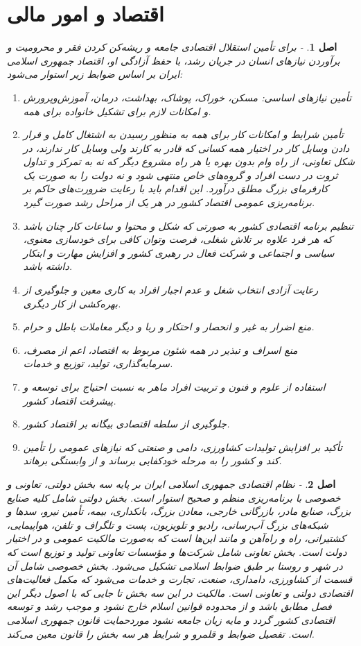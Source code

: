 \documentclass[12pt]{article}
\newtheorem{asl}{اصل}
\begin{document}
\section{اقتصاد و امور مالی}
\begin{asl}- 
برای تأمین استقلال اقتصادی جامعه و ریشه‌کن کردن فقر و محرومیت و برآوردن نیازهای انسان در جریان رشد، با حفظ آزادگی او، اقتصاد جمهوری اسلامی ایران بر اساس ضوابط زیر استوار می‌شود:
\begin{enumerate}
	\item 
	تأمین نیازهای اساسی‌: مسکن‌، خوراک‌، پوشاک‌، بهداشت‌، درمان‌، آموزش‌وپرورش و امکانات لازم برای تشکیل خانواده برای همه‌.
	\item
	تأمین شرایط و امکانات کار برای همه به منظور رسیدن به اشتغال کامل و قرار دادن وسایل کار در اختیار همه کسانی که قادر به کارند ولی وسایل کار ندارند، در شکل تعاونی‌، از راه وام بدون بهره یا هر راه مشروع دیگر که نه به تمرکز و تداول ثروت در دست افراد و گروه‌های خاص منتهی شود و نه دولت را به صورت یک کارفرمای بزرگ مطلق درآورد. این اقدام باید با رعایت ضرورت‌های حاکم بر برنامه‌ریزی عمومی اقتصاد کشور در هر یک از مراحل رشد صورت گیرد.
	\item
	تنظیم برنامه اقتصادی کشور به صورتی که شکل و محتوا و ساعات کار چنان باشد که هر فرد علاوه بر تلاش شغلی‌، فرصت وتوان کافی برای خودسازی معنوی‌، سیاسی و اجتماعی و شرکت فعال در رهبری کشور و افزایش مهارت و ابتکار داشته باشد.	
	\item
	رعایت آزادی انتخاب شغل و عدم اجبار افراد به کاری معین و جلوگیری از بهره‌کشی از کار دیگری‌.	
	\item
	منع اضرار به غیر و انحصار و احتکار و ربا و دیگر معاملات باطل و حرام‌.
	\item
	منع اسراف و تبذیر در همه شئون مربوط به اقتصاد، اعم از مصرف، سرمایه‌گذاری‌، تولید، توزیع و خدمات‌.
	\item
	استفاده از علوم و فنون و تربیت افراد ماهر به نسبت احتیاج برای توسعه و پیشرفت اقتصاد کشور.
	\item
	جلوگیری از سلطه اقتصادی بیگانه بر اقتصاد کشور.
	\item
	تأکید بر افزایش تولیدات کشاورزی‌، دامی و صنعتی که نیازهای عمومی را تأمین کند و کشور را به مرحله خودکفایی برساند و از وابستگی برهاند.
\end{enumerate}
\end{asl}

\begin{asl}- 
نظام اقتصادی جمهوری اسلامی ایران بر پایه سه بخش دولتی‌، تعاونی و خصوصی با برنامه‌ریزی منظم و صحیح استوار است‌.
بخش دولتی شامل کلیه صنایع بزرگ‌، صنایع مادر، بازرگانی خارجی، معادن بزرگ‌، بانکداری‌، بیمه‌، تأمین نیرو، سدها و شبکه‌های بزرگ آب‌رسانی، رادیو و تلویزیون‌، پست و تلگراف و تلفن، هواپیمایی‌، کشتیرانی‌، راه و راه‌آهن و مانند این‌ها است که به‌صورت مالکیت عمومی و در اختیار دولت است‌.
بخش تعاونی شامل شرکت‌ها و مؤسسات تعاونی تولید و توزیع است که در شهر و روستا بر طبق ضوابط اسلامی تشکیل می‌شود.
بخش خصوصی شامل آن قسمت از کشاورزی‌، دامداری‌، صنعت‌، تجارت و خدمات می‌شود که مکمل فعالیت‌های اقتصادی دولتی و تعاونی است‌.
مالکیت در این سه بخش تا جایی که با اصول دیگر این فصل مطابق باشد و از محدوده قوانین اسلام خارج نشود و موجب رشد و توسعه اقتصادی کشور گردد و مایه زیان جامعه نشود موردحمایت قانون جمهوری اسلامی است‌.
تفصیل ضوابط و قلمرو و شرایط هر سه بخش را قانون معین می‌کند.
\end{asl}
\end{document}
